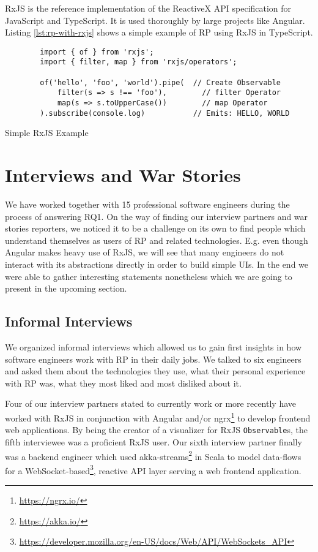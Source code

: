 \documentclass[12pt,a4paper]{article}
\begin{document}
RxJS is the reference implementation of the ReactiveX API specification for JavaScript and TypeScript. It is used thoroughly by large projects like Angular\cite{angualrrxjs}. Listing \ref{lst:rp-with-rxjs} shows a simple example of RP using RxJS in TypeScript.

\begin{listing}[H]
	\begin{verbatim}
		import { of } from 'rxjs';
		import { filter, map } from 'rxjs/operators';

		of('hello', 'foo', 'world').pipe(  // Create Observable
			filter(s => s !== 'foo'),        // filter Operator
			map(s => s.toUpperCase())        // map Operator
		).subscribe(console.log)           // Emits: HELLO, WORLD
	\end{verbatim}
	\caption{Simple RxJS Example}
	\label{lst:rp-with-rxjs}
\end{listing}

\section{Interviews and War Stories}
\label{sec:interviews}

We have worked together with 15 professional software engineers during the process of answering RQ1. On the way of finding our interview partners and war stories reporters, we noticed it to be a challenge on its own to find people which understand themselves as users of RP and related technologies. E.g. even though Angular makes heavy use of RxJS, we will see that many engineers do not interact with its abstractions directly in order to build simple UIs. In the end we were able to gather interesting statements nonetheless which we are going to present in the upcoming section.

\subsection{Informal Interviews}

We organized informal interviews which allowed us to gain first insights in how software engineers work with RP in their daily jobs. We talked to six engineers and asked them about the technologies they use, what their personal experience with RP was, what they most liked and most disliked about it.

Four of our interview partners stated to currently work or more recently have worked with RxJS in conjunction with Angular and/or ngrx\footnote{\url{https://ngrx.io/}} to develop frontend web applications. By being the creator of a visualizer for RxJS \texttt{Observable}s, the fifth interviewee was a proficient RxJS user. Our sixth interview partner finally was a backend engineer which used akka-streams\footnote{\url{https://akka.io/}} in Scala to model data-flows for a WebSocket-based\footnote{\url{https://developer.mozilla.org/en-US/docs/Web/API/WebSockets_API}}, reactive API layer serving a web frontend application.
\end{document}
